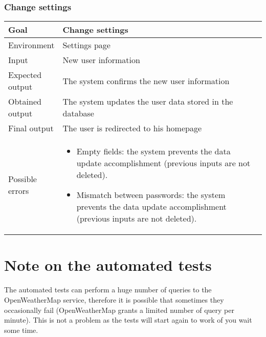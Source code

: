 \documentclass[10pt,a4paper,titlepage]{article}
\begin{document}
\section{Change settings}
\begin{tabular}{| p{0.2\linewidth} | p{0.8\linewidth} |}
\hline Goal & Change settings \\
\hline Environment & Settings page \\
\hline Input & New user information \\
\hline Expected output & The system confirms the new user information \\
\hline Obtained output & The system updates the user data stored in the database \\
\hline Final output & The user is redirected to his homepage \\
\hline Possible errors &
\begin{itemize}
\item Empty fields: the system prevents the data update accomplishment
(previous inputs are not deleted).
\item Mismatch between passwords: the system prevents the data update
accomplishment (previous inputs are not deleted).
\end{itemize}\\
\hline
\end{tabular}


\pagebreak
\part{Note on the automated tests}
The automated tests can perform a huge number of queries to the OpenWeatherMap service, therefore it is possible that sometimes they occasionally fail (OpenWeatherMap grants a limited number of query per minute). This is not a problem as the tests will start again to work of you wait some time.
 
\end{document}
